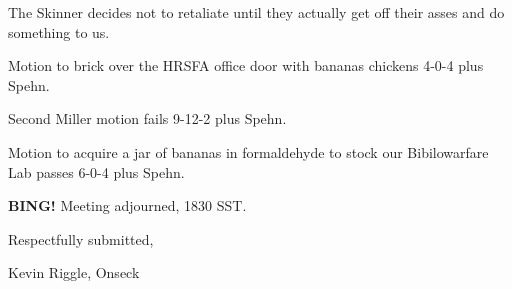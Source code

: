 \documentclass[10pt]{article}
\newcommand{\bing}{{\bf BING!} }
\newcommand{\ps}{ plus Spehn\xspace}
\begin{document}
The Skinner decides not to retaliate until they actually get off their asses and do something to us.

Motion to brick over the HRSFA office door with bananas chickens 4-0-4\ps.

Second Miller motion fails 9-12-2\ps.

Motion to acquire a jar of bananas in formaldehyde to stock our Bibilowarfare Lab passes 6-0-4\ps.

\bing
\noindent
Meeting adjourned, 1830 SST.

\vspace{18pt}

\centerline{Respectfully submitted,}
\centerline{Kevin Riggle, Onseck}
\end{document}
